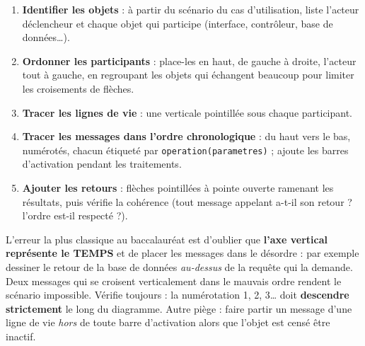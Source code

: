 \documentclass[11pt]{article}
\begin{document}
\begin{methode}
\begin{enumerate}
\item \textbf{Identifier les objets} : à partir du scénario du cas d'utilisation, liste l'acteur déclencheur et chaque objet qui participe (interface, contrôleur, base de données\ldots).
\item \textbf{Ordonner les participants} : place-les en haut, de gauche à droite, l'acteur tout à gauche, en regroupant les objets qui échangent beaucoup pour limiter les croisements de flèches.
\item \textbf{Tracer les lignes de vie} : une verticale pointillée sous chaque participant.
\item \textbf{Tracer les messages dans l'ordre chronologique} : du haut vers le bas, numérotés, chacun étiqueté par \texttt{operation(parametres)} ; ajoute les barres d'activation pendant les traitements.
\item \textbf{Ajouter les retours} : flèches pointillées à pointe ouverte ramenant les résultats, puis vérifie la cohérence (tout message appelant a-t-il son retour ? l'ordre est-il respecté ?).
\end{enumerate}
\end{methode}

\begin{attention}
L'erreur la plus classique au baccalauréat est d'oublier que \textbf{l'axe vertical représente le TEMPS} et de placer les messages dans le désordre : par exemple dessiner le retour de la base de données \emph{au-dessus} de la requête qui la demande. Deux messages qui se croisent verticalement dans le mauvais ordre rendent le scénario impossible. Vérifie toujours : la numérotation 1, 2, 3\ldots{} doit \textbf{descendre strictement} le long du diagramme. Autre piège : faire partir un message d'une ligne de vie \emph{hors} de toute barre d'activation alors que l'objet est censé être inactif.
\end{attention}
\end{document}
